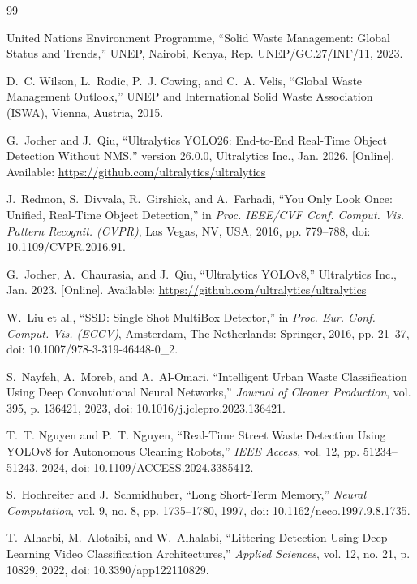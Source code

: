 \documentclass[conference]{IEEEtran}
\begin{document}
\begin{thebibliography}{99}

United Nations Environment Programme,
``Solid Waste Management: Global Status and Trends,''
UNEP, Nairobi, Kenya, Rep. UNEP/GC.27/INF/11, 2023.

D.~C. Wilson, L.~Rodic, P.~J. Cowing, and C.~A. Velis,
``Global Waste Management Outlook,''
UNEP and International Solid Waste Association (ISWA), Vienna, Austria, 2015.

G.~Jocher and J.~Qiu,
``Ultralytics YOLO26: End-to-End Real-Time Object Detection Without NMS,''
version 26.0.0, Ultralytics Inc., Jan. 2026.
[Online]. Available: \url{https://github.com/ultralytics/ultralytics}

J.~Redmon, S.~Divvala, R.~Girshick, and A.~Farhadi,
``You Only Look Once: Unified, Real-Time Object Detection,''
in \textit{Proc. IEEE/CVF Conf. Comput. Vis. Pattern Recognit. (CVPR)},
Las Vegas, NV, USA, 2016, pp. 779--788, doi: 10.1109/CVPR.2016.91.

G.~Jocher, A.~Chaurasia, and J.~Qiu,
``Ultralytics YOLOv8,''
Ultralytics Inc., Jan. 2023.
[Online]. Available: \url{https://github.com/ultralytics/ultralytics}

W.~Liu et al.,
``SSD: Single Shot MultiBox Detector,''
in \textit{Proc. Eur. Conf. Comput. Vis. (ECCV)},
Amsterdam, The Netherlands: Springer, 2016, pp. 21--37, doi: 10.1007/978-3-319-46448-0\_2.

S.~Nayfeh, A.~Moreb, and A.~Al-Omari,
``Intelligent Urban Waste Classification Using Deep Convolutional Neural Networks,''
\textit{Journal of Cleaner Production}, vol. 395, p. 136421, 2023, doi: 10.1016/j.jclepro.2023.136421.

T.~T. Nguyen and P.~T. Nguyen,
``Real-Time Street Waste Detection Using YOLOv8 for Autonomous Cleaning Robots,''
\textit{IEEE Access}, vol. 12, pp. 51234--51243, 2024, doi: 10.1109/ACCESS.2024.3385412.

S.~Hochreiter and J.~Schmidhuber,
``Long Short-Term Memory,''
\textit{Neural Computation}, vol. 9, no. 8, pp. 1735--1780, 1997, doi: 10.1162/neco.1997.9.8.1735.

T.~Alharbi, M.~Alotaibi, and W.~Alhalabi,
``Littering Detection Using Deep Learning Video Classification Architectures,''
\textit{Applied Sciences}, vol. 12, no. 21, p. 10829, 2022, doi: 10.3390/app122110829.


\end{thebibliography}
\end{document}
